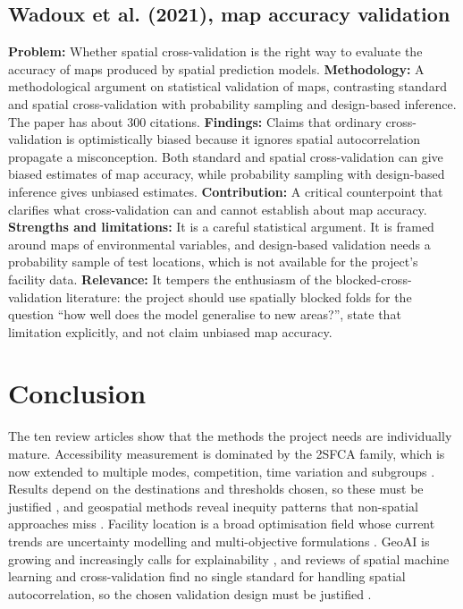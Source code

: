 \documentclass[journal]{IEEEtran}
\begin{document}
\subsection{Wadoux et al. (2021), map accuracy validation \cite{wadoux2021}}
\textbf{Problem:} Whether spatial cross-validation is the right way to evaluate the accuracy of maps produced by spatial prediction models.
\textbf{Methodology:} A methodological argument on statistical validation of maps, contrasting standard and spatial cross-validation with probability sampling and design-based inference. The paper has about 300 citations.
\textbf{Findings:} Claims that ordinary cross-validation is optimistically biased because it ignores spatial autocorrelation propagate a misconception. Both standard and spatial cross-validation can give biased estimates of map accuracy, while probability sampling with design-based inference gives unbiased estimates.
\textbf{Contribution:} A critical counterpoint that clarifies what cross-validation can and cannot establish about map accuracy.
\textbf{Strengths and limitations:} It is a careful statistical argument. It is framed around maps of environmental variables, and design-based validation needs a probability sample of test locations, which is not available for the project's facility data.
\textbf{Relevance:} It tempers the enthusiasm of the blocked-cross-validation literature: the project should use spatially blocked folds for the question ``how well does the model generalise to new areas?'', state that limitation explicitly, and not claim unbiased map accuracy.

\section{Conclusion}
\label{sec:conclusion}

The ten review articles show that the methods the project needs are individually mature. Accessibility measurement is dominated by the 2SFCA family, which is now extended to multiple modes, competition, time variation and subgroups \cite{stacherl2023,park2021}. Results depend on the destinations and thresholds chosen, so these must be justified \cite{ravensbergen2022}, and geospatial methods reveal inequity patterns that non-spatial approaches miss \cite{rwandashi2026}. Facility location is a broad optimisation field whose current trends are uncertainty modelling and multi-objective formulations \cite{saldanha2022,dissanayake2024}. GeoAI is growing and increasingly calls for explainability \cite{liu2022,boutayeb2025}, and reviews of spatial machine learning and cross-validation find no single standard for handling spatial autocorrelation, so the chosen validation design must be justified \cite{jemeljanova2024,otto2024}.
\end{document}
